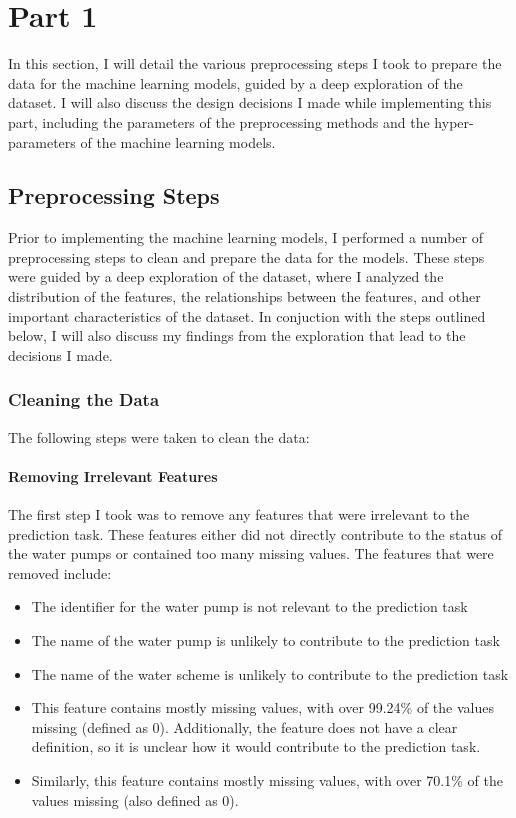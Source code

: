 \documentclass{article}
\begin{document}
\section{Part 1}
In this section, I will detail the various preprocessing steps I took to prepare the data for the machine learning models, guided by a deep exploration of the dataset. I will also discuss the design decisions I made while implementing this part, including the parameters of the preprocessing methods and the hyper-parameters of the machine learning models.

\subsection{Preprocessing Steps}
Prior to implementing the machine learning models, I performed a number of preprocessing steps to clean and prepare the data for the models. These steps were guided by a deep exploration of the dataset, where I analyzed the distribution of the features, the relationships between the features, and other important characteristics of the dataset. In conjuction with the steps outlined below, I will also discuss my findings from the exploration that lead to the decisions I made.

\subsubsection{Cleaning the Data}
The following steps were taken to clean the data:

\paragraph{Removing Irrelevant Features}
The first step I took was to remove any features that were irrelevant to the prediction task. These features either did not directly contribute to the status of the water pumps or contained too many missing values. The features that were removed include:

\begin{itemize}
  \item {} The identifier for the water pump is not relevant to the prediction task
  \item {} The name of the water pump is unlikely to contribute to the prediction task
  \item {} The name of the water scheme is unlikely to contribute to the prediction task
  \item {} This feature contains mostly missing values, with over 99.24\% of the values missing (defined as 0). Additionally, the feature does not have a clear definition, so it is unclear how it would contribute to the prediction task.
  \item {} Similarly, this feature contains mostly missing values, with over 70.1\% of the values missing (also defined as 0). 
\end{itemize}
\end{document}
